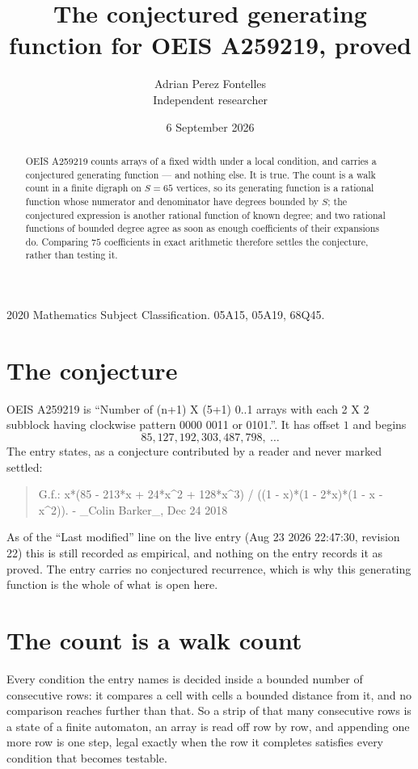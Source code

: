 \documentclass[11pt,a4paper]{article}
\title{The conjectured generating function for OEIS A259219, proved}
\author{Adrian Perez Fontelles\\ \small Independent researcher}
\date{6 September 2026}
\theoremstyle{plain}
\theoremstyle{definition}
\begin{document}
\maketitle

\begin{abstract}
OEIS A259219 counts arrays of a fixed width under a local condition, and carries a conjectured
generating function --- and nothing else. It is true. The count is a walk count in a finite
digraph on $S=65$ vertices, so its generating function is a rational function whose numerator
and denominator have degrees bounded by $S$; the conjectured expression is another rational
function of known degree; and two rational functions of bounded degree agree as soon as enough
coefficients of their expansions do. Comparing $75$ coefficients in exact arithmetic
therefore settles the conjecture, rather than testing it.
\end{abstract}

\noindent\small 2020 Mathematics Subject Classification. 05A15, 05A19, 68Q45.\normalsize

\section{The conjecture}

OEIS A259219 is ``Number of (n+1) X (5+1) 0..1 arrays with each 2 X 2 subblock having clockwise pattern 0000 0011 or 0101.''. It has offset $1$ and begins
\[
85, 127, 192, 303, 487, 798,\ \dots
\]
The entry states, as a conjecture contributed by a reader and never marked settled:
\begin{quote}
G.f.: x*(85 - 213*x + 24*x\^{}2 + 128*x\^{}3) / ((1 - x)*(1 - 2*x)*(1 - x - x\^{}2)). - \_Colin Barker\_, Dec 24 2018
\end{quote}
As of the ``Last modified'' line on the live entry (Aug 23 2026 22:47:30, revision 22) this is still
recorded as empirical, and nothing on the entry records it as proved. The entry carries no
conjectured recurrence, which is why this generating function is the whole of what is open
here.

\section{The count is a walk count}

Every condition the entry names is decided inside a bounded number of consecutive rows: it
compares a cell with cells a bounded distance from it, and no comparison reaches further than
that. So a strip of that many consecutive rows is a state of a finite automaton, an array is
read off row by row, and appending one more row is one step, legal exactly when the row it
completes satisfies every condition that becomes testable.
\end{document}
